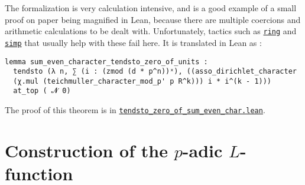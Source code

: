 \documentclass[a4paper,UKenglish,cleveref, autoref, thm-restate,pdfa]{lipics-v2021}
\newcommand{\lean}[1]{\texttt{#1}\xspace} %
\begin{document}
The formalization is very calculation intensive, and is a good example of a small proof on paper being magnified in Lean, 
because there are multiple coercions and arithmetic calculations to be dealt with. %
Unfortunately, tactics such as \href{https://leanprover-community.github.io/mathlib_docs/tactics.html#ring}{\lean{ring}} and 
\href{https://leanprover-community.github.io/mathlib_docs/tactics.html#simp}{\lean{simp}} that usually help with these fail here. 
It is translated in Lean as :
\begin{lstlisting}
lemma sum_even_character_tendsto_zero_of_units :
  tendsto (λ n, ∑ (i : (zmod (d * p^n))ˣ), ((asso_dirichlet_character
  (χ.mul (teichmuller_character_mod_p' p R^k))) i * i^(k - 1))) 
  at_top ( 𝓝 0) 
\end{lstlisting}
The proof of this theorem is in \href{https://github.com/laughinggas/p-adic-L-functions/blob/main/src/tendsto_zero_of_sum_even_char.lean}{\lean{tendsto\_zero\_of\_sum\_even\_char.lean}}.
\section{Construction of the $p$-adic $L$-function}
\label{section3}
\end{document}
